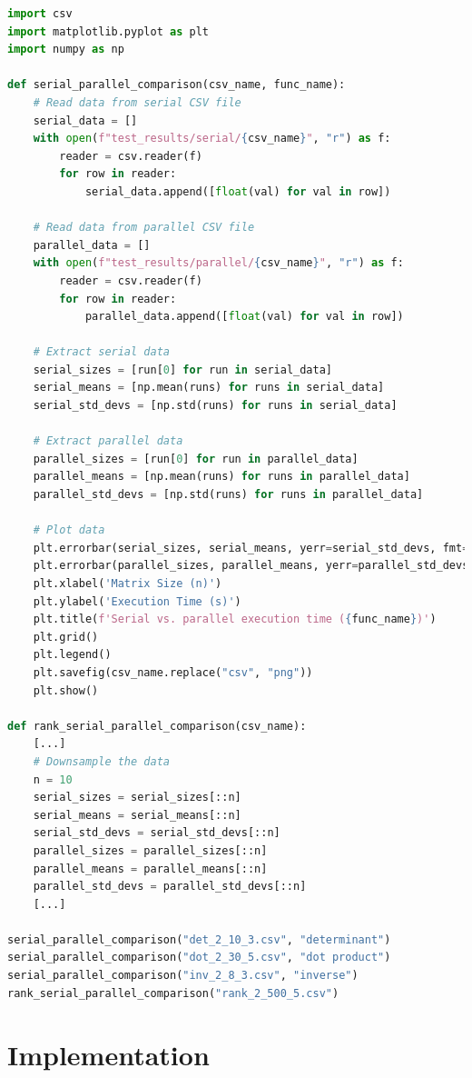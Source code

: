 \begin{lstlisting}[language=Python, label=plots.py]
import csv
import matplotlib.pyplot as plt
import numpy as np

def serial_parallel_comparison(csv_name, func_name):
    # Read data from serial CSV file
    serial_data = []
    with open(f"test_results/serial/{csv_name}", "r") as f:
        reader = csv.reader(f)
        for row in reader:
            serial_data.append([float(val) for val in row])

    # Read data from parallel CSV file
    parallel_data = []
    with open(f"test_results/parallel/{csv_name}", "r") as f:
        reader = csv.reader(f)
        for row in reader:
            parallel_data.append([float(val) for val in row])

    # Extract serial data
    serial_sizes = [run[0] for run in serial_data]
    serial_means = [np.mean(runs) for runs in serial_data]
    serial_std_devs = [np.std(runs) for runs in serial_data]

    # Extract parallel data
    parallel_sizes = [run[0] for run in parallel_data]
    parallel_means = [np.mean(runs) for runs in parallel_data]
    parallel_std_devs = [np.std(runs) for runs in parallel_data]

    # Plot data
    plt.errorbar(serial_sizes, serial_means, yerr=serial_std_devs, fmt='o-', label='Serial Execution Time')
    plt.errorbar(parallel_sizes, parallel_means, yerr=parallel_std_devs, fmt='x-', label='Parallel Execution Time')
    plt.xlabel('Matrix Size (n)')
    plt.ylabel('Execution Time (s)')
    plt.title(f'Serial vs. parallel execution time ({func_name})')
    plt.grid()
    plt.legend()
    plt.savefig(csv_name.replace("csv", "png"))
    plt.show()

def rank_serial_parallel_comparison(csv_name):
    [...]
    # Downsample the data
    n = 10
    serial_sizes = serial_sizes[::n]
    serial_means = serial_means[::n]
    serial_std_devs = serial_std_devs[::n]
    parallel_sizes = parallel_sizes[::n]
    parallel_means = parallel_means[::n]
    parallel_std_devs = parallel_std_devs[::n]
    [...]

serial_parallel_comparison("det_2_10_3.csv", "determinant")
serial_parallel_comparison("dot_2_30_5.csv", "dot product")
serial_parallel_comparison("inv_2_8_3.csv", "inverse")
rank_serial_parallel_comparison("rank_2_500_5.csv")
\end{lstlisting}
\section{Implementation}
